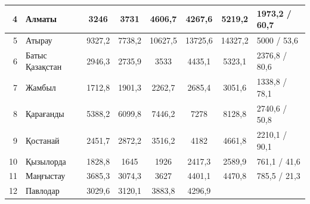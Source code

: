 \begin{table}[H]
{\begin{tabular}{|rlcccccl|}
  \multicolumn{1}{|r|}{4} &
    \multicolumn{1}{l|}{Алматы} &
    \multicolumn{1}{c|}{3246} &
    \multicolumn{1}{c|}{3731} &
    \multicolumn{1}{c|}{4606,7} &
    \multicolumn{1}{c|}{4267,6} &
    \multicolumn{1}{c|}{5219,2} &
    1973,2 / 60,7 \\ \hline
  \multicolumn{1}{|r|}{5} &
    \multicolumn{1}{l|}{Атырау} &
    \multicolumn{1}{c|}{9327,2} &
    \multicolumn{1}{c|}{7738,2} &
    \multicolumn{1}{c|}{10627,5} &
    \multicolumn{1}{c|}{13725,6} &
    \multicolumn{1}{c|}{14327,2} &
    5000 / 53,6 \\ \hline
  \multicolumn{1}{|r|}{6} &
    \multicolumn{1}{l|}{Батыс Қазақстан} &
    \multicolumn{1}{c|}{2946,3} &
    \multicolumn{1}{c|}{2735,9} &
    \multicolumn{1}{c|}{3533} &
    \multicolumn{1}{c|}{4435,1} &
    \multicolumn{1}{c|}{5323,1} &
    2376,8 / 80,6 \\ \hline
  \multicolumn{1}{|r|}{7} &
    \multicolumn{1}{l|}{Жамбыл} &
    \multicolumn{1}{c|}{1712,8} &
    \multicolumn{1}{c|}{1901,3} &
    \multicolumn{1}{c|}{2262,7} &
    \multicolumn{1}{c|}{2685,4} &
    \multicolumn{1}{c|}{3051,6} &
    1338,8 / 78,1 \\ \hline
  \multicolumn{1}{|r|}{8} &
    \multicolumn{1}{l|}{Қарағанды} &
    \multicolumn{1}{c|}{5388,2} &
    \multicolumn{1}{c|}{6099,8} &
    \multicolumn{1}{c|}{7446,2} &
    \multicolumn{1}{c|}{7278} &
    \multicolumn{1}{c|}{8128,8} &
    2740,6 / 50,8 \\ \hline
  \multicolumn{1}{|r|}{9} &
    \multicolumn{1}{l|}{Қостанай} &
    \multicolumn{1}{c|}{2451,7} &
    \multicolumn{1}{c|}{2872,2} &
    \multicolumn{1}{c|}{3516,2} &
    \multicolumn{1}{c|}{4182} &
    \multicolumn{1}{c|}{4661,8} &
    2210,1 / 90,1 \\ \hline
  \multicolumn{1}{|r|}{10} &
    \multicolumn{1}{l|}{Қызылорда} &
    \multicolumn{1}{c|}{1828,8} &
    \multicolumn{1}{c|}{1645} &
    \multicolumn{1}{c|}{1926} &
    \multicolumn{1}{c|}{2417,3} &
    \multicolumn{1}{c|}{2589,9} &
    761,1 / 41,6 \\ \hline
  \multicolumn{1}{|r|}{11} &
    \multicolumn{1}{l|}{Маңғыстау} &
    \multicolumn{1}{c|}{3685,3} &
    \multicolumn{1}{c|}{3074,3} &
    \multicolumn{1}{c|}{3627} &
    \multicolumn{1}{c|}{4401,1} &
    \multicolumn{1}{c|}{4470,8} &
    785,5 / 21,3 \\ \hline
  \multicolumn{1}{|r|}{12} &
    \multicolumn{1}{l|}{Павлодар} &
    \multicolumn{1}{c|}{3029,6} &
    \multicolumn{1}{c|}{3120,1} &
    \multicolumn{1}{c|}{3883,8} &
    \multicolumn{1}{c|}{4296,9} &

\end{tabular}}
\end{table}
